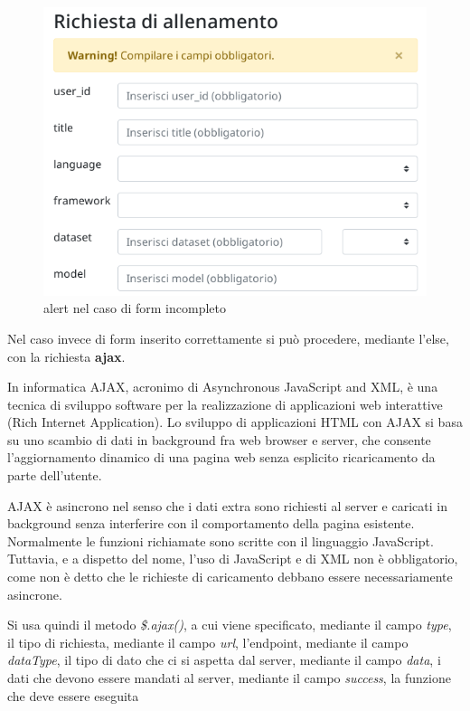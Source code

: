 \documentclass[a4paper,12pt, oneside]{book}
\begin{document}
\begin{figure}[H]
  \centering
  \includegraphics[scale = 0.7]{img/err-form.png}
  \caption{alert nel caso di form incompleto}
\end{figure}
Nel caso invece di form inserito correttamente si può procedere, mediante l'else, con la richiesta \textbf{ajax}.\\
\begin{shaded}
In informatica AJAX, acronimo di Asynchronous JavaScript and XML, è una tecnica di sviluppo software per la realizzazione di applicazioni web interattive (Rich Internet Application). Lo sviluppo di applicazioni HTML con AJAX si basa su uno scambio di dati in background fra web browser e server, che consente l'aggiornamento dinamico di una pagina web senza esplicito ricaricamento da parte dell'utente.

AJAX è asincrono nel senso che i dati extra sono richiesti al server e caricati in background senza interferire con il comportamento della pagina esistente. Normalmente le funzioni richiamate sono scritte con il linguaggio JavaScript. Tuttavia, e a dispetto del nome, l'uso di JavaScript e di XML non è obbligatorio, come non è detto che le richieste di caricamento debbano essere necessariamente asincrone. 
\end{shaded}
Si usa quindi il metodo \textit{\$.ajax()}, a cui viene specificato, mediante il campo
\textit{type}, il tipo di richiesta, mediante il campo \textit{url}, l'endpoint,
mediante il campo \textit{dataType}, il tipo di dato che ci si aspetta dal server,
mediante il campo \textit{data}, i dati che devono essere mandati al server, mediante il campo \textit{success}, la funzione che deve essere eseguita
\end{document}
